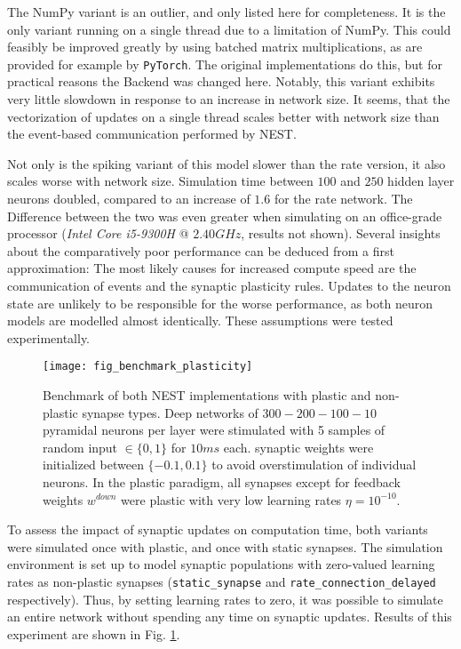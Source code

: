 The NumPy variant is an outlier, and only listed here for completeness. It is the only variant running on a single
thread due to a limitation of NumPy. This could feasibly be improved greatly by using batched matrix multiplications, as
are provided for example by \texttt{PyTorch}. The original implementations do this, but for practical reasons the
Backend was changed here. Notably, this variant exhibits very little slowdown in response to an increase in network
size. It seems, that the vectorization of updates on a single thread scales better with network size than the
event-based communication performed by NEST.

Not only is the spiking variant of this model slower than the rate version, it also scales worse with network size.
Simulation time between $100$ and $250$ hidden layer neurons doubled, compared to an increase of $1.6$ for the rate
network. The Difference between the two was even greater when simulating on an office-grade processor (\textit{Intel
    Core i5-9300H} @ $2.40GHz$, results not shown). Several insights about the comparatively poor performance can be deduced
from a first approximation: The most likely causes for increased compute speed are the communication of events and the
synaptic plasticity rules. Updates to the neuron state are unlikely to be responsible for the worse performance, as both
neuron models are modelled almost identically. These assumptions were tested experimentally.



\begin{figure}[h]
    \centering
    \texttt{[image: fig\_benchmark\_plasticity]}
    \caption[Benchmark of both NEST implementations with plastic and non-plastic synapse types]{Benchmark of both NEST
        implementations with plastic and non-plastic synapse types. Deep networks of $300-200-100-10$ pyramidal neurons
        per layer were stimulated with 5 samples of random input $\in\{0,1\}$ for $10ms$ each. synaptic weights were
        initialized between $\{-0.1, 0.1 \}$ to avoid overstimulation of individual neurons. In the plastic paradigm,
        all synapses except for feedback weights $w^{down}$ were plastic with very low learning rates $\eta =
            10^{-10}$.}
    \label{fig-benchmark-plasticity}
\end{figure}


To assess the impact of synaptic updates on computation time, both variants were simulated once with plastic, and once
with static synapses. The simulation environment is set up to model synaptic populations with zero-valued learning rates
as non-plastic synapses (\texttt{static\_synapse} and \texttt{rate\_connection\_delayed} respectively). Thus, by setting
learning rates to zero, it was possible to simulate an entire network without spending any time on synaptic updates.
Results of this experiment are shown in Fig. \ref{fig-benchmark-plasticity}.

